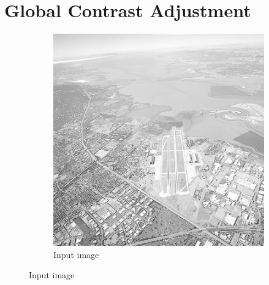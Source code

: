 \documentclass[a4paper]{article}
\begin{document}
\section{Global Contrast Adjustment}
\begin{figure}[H]
	\begin{subfigure}[h]{0.48\textwidth}
		\centering
		\includegraphics[width=\textwidth]{linearContrast_input2}
		\caption*{Input image}
	\end{subfigure}
	

\end{figure}
\end{document}
